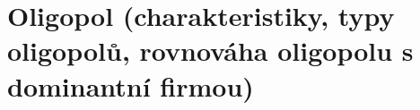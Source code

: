 \clearpage
\section{Oligopol (charakteristiky, typy oligopolů, rovnováha oligopolu s dominantní firmou)}